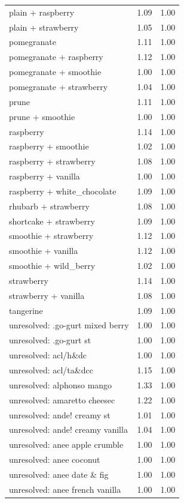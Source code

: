 \begin{table}
\begin{tabular}{lrr}
plain + raspberry & 1.09 & 1.00 \\
plain + strawberry & 1.05 & 1.00 \\
pomegranate & 1.11 & 1.00 \\
pomegranate + raspberry & 1.12 & 1.00 \\
pomegranate + smoothie & 1.00 & 1.00 \\
pomegranate + strawberry & 1.04 & 1.00 \\
prune & 1.11 & 1.00 \\
prune + smoothie & 1.00 & 1.00 \\
raspberry & 1.14 & 1.00 \\
raspberry + smoothie & 1.02 & 1.00 \\
raspberry + strawberry & 1.08 & 1.00 \\
raspberry + vanilla & 1.00 & 1.00 \\
raspberry + white\_chocolate & 1.09 & 1.00 \\
rhubarb + strawberry & 1.08 & 1.00 \\
shortcake + strawberry & 1.09 & 1.00 \\
smoothie + strawberry & 1.12 & 1.00 \\
smoothie + vanilla & 1.12 & 1.00 \\
smoothie + wild\_berry & 1.02 & 1.00 \\
strawberry & 1.14 & 1.00 \\
strawberry + vanilla & 1.08 & 1.00 \\
tangerine & 1.09 & 1.00 \\
unresolved: .go-gurt mixed berry & 1.00 & 1.00 \\
unresolved: .go-gurt st & 1.00 & 1.00 \\
unresolved: acl/h\&dc & 1.00 & 1.00 \\
unresolved: acl/ta\&dcc & 1.15 & 1.00 \\
unresolved: alphonso mango & 1.33 & 1.00 \\
unresolved: amaretto cheesec & 1.22 & 1.00 \\
unresolved: ande! creamy st & 1.01 & 1.00 \\
unresolved: ande! creamy vanilla & 1.04 & 1.00 \\
unresolved: anee apple crumble & 1.00 & 1.00 \\
unresolved: anee coconut & 1.00 & 1.00 \\
unresolved: anee date \& fig & 1.00 & 1.00 \\
unresolved: anee french vanilla & 1.00 & 1.00 \\

\end{tabular}
\end{table}
